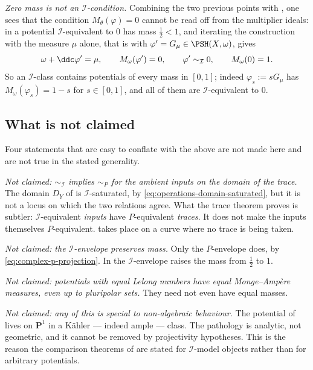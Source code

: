 \emph{Zero mass is not an \(\mathcal I\)-condition.}  Combining the two
previous points with , one sees that the
condition \(M_\theta(\varphi)=0\) cannot be read off from the multiplier
ideals: in  a potential \(\mathcal I\)-equivalent to
\(0\) has mass \(\tfrac12<1\), and iterating the construction with the
measure \(\mu\) alone, that is with
\(\varphi'=G_\mu\in\PSH(X,\omega)\), gives
\[
 \omega+\ddc\varphi'=\mu,
 \qquad
 M_\omega(\varphi')=0,
 \qquad
 \varphi'\sim_{\mathcal I}0,
 \qquad
 M_\omega(0)=1 .
\]
So an \(\mathcal I\)-class contains potentials of every mass in
\([0,1]\); indeed \(\varphi_s:=sG_\mu\) has
\(M_\omega(\varphi_s)=1-s\) for \(s\in[0,1]\), and all of them are
\(\mathcal I\)-equivalent to \(0\).

\subsection{What is not claimed}
\label{sec:ch51-not-claimed}

Four statements that are easy to conflate with the above are not made
here and are not true in the stated generality.

\emph{Not claimed: \(\sim_{\mathcal I}\) implies \(\sim_P\) for the
ambient inputs on the domain of the trace.}  The domain \(D_Y\) of
 is \(\mathcal I\)-saturated, by
\eqref{eq:operations-domain-saturated}, but it is not a locus on which
the two relations agree.  What the trace theorem proves is subtler:
\(\mathcal I\)-equivalent \emph{inputs} have \(P\)-equivalent
\emph{traces}.  It does not make the inputs themselves \(P\)-equivalent.
 takes place on a curve where no trace is being taken.

\emph{Not claimed: the \(\mathcal I\)-envelope preserves mass.}  Only the
\(P\)-envelope does, by \eqref{eq:complex-p-projection}.  In
 the \(\mathcal I\)-envelope raises the mass from
\(\tfrac12\) to \(1\).

\emph{Not claimed: potentials with equal Lelong numbers have equal
Monge--Amp\`ere measures, even up to pluripolar sets.}  They need not even
have equal masses.

\emph{Not claimed: any of this is special to non-algebraic behaviour.}
The potential of  lives on \(\mathbf P^1\) in a
K\"ahler --- indeed ample --- class.  The pathology is analytic, not
geometric, and it cannot be removed by projectivity hypotheses.  This is
the reason the comparison theorems of
 are stated for \(\mathcal I\)-model
objects rather than for arbitrary potentials.


